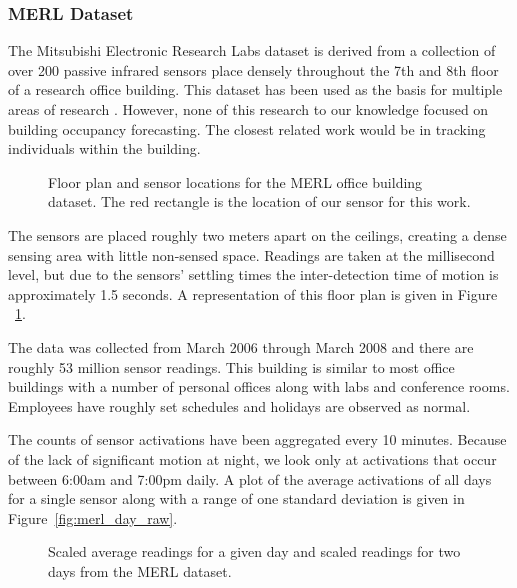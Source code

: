 \subsubsection{MERL Dataset} 
The Mitsubishi Electronic Research Labs dataset is derived from a collection of over 200 passive infrared sensors place densely throughout the 7th and 8th floor of a research office building.  This dataset has been used as the basis for multiple areas of research \cite{Wren2003, Wren2006, Wren2007a, Dong2011, Minnen2004, Wren2006a, Wren2007}.  However, none of this research to our knowledge focused on building occupancy forecasting.  The closest related work would be in tracking individuals within the building.

\begin{figure}[!ht]
	\begin{center}
	\end{center}
	\caption{Floor plan and sensor locations for the MERL office building dataset.  The red rectangle is the location of our sensor for this work.}
	\label{fig:merlfloor}
\end{figure}

The sensors are placed roughly two meters apart on the ceilings, creating a dense sensing area with little non-sensed space.  Readings are taken at the millisecond level, but due to the sensors' settling times the inter-detection time of motion is approximately 1.5 seconds.  A representation of this floor plan is given in Figure ~\ref{fig:merlfloor}.

The data was collected from March 2006 through March 2008 and there are roughly 53 million sensor readings.  This building is similar to most office buildings with a number of personal offices along with labs and conference rooms.  Employees have roughly set schedules and holidays are observed as normal. 

The counts of sensor activations have been aggregated every 10 minutes.  Because of the lack of significant motion at night, we look only at activations that occur between 6:00am and 7:00pm daily.  A plot of the average activations of all days for a single sensor along with a range of one standard deviation is given in Figure~\ref{fig:merl_day_raw}.

\begin{figure}[!ht]
	\begin{center}
		\label{fig:merl_scaled_aggregate}
		\label{fig:merl_scaled_raw}
	\end{center}
	\caption{Scaled average readings for a given day and scaled readings for two days from the MERL dataset.}
\end{figure}

